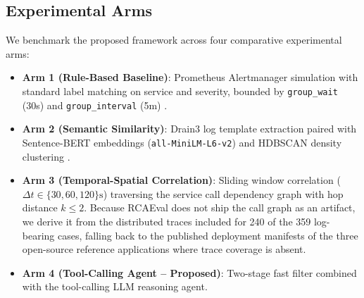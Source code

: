 \documentclass[conference]{IEEEtran}
\begin{document}
\subsection{Experimental Arms}
We benchmark the proposed framework across four comparative experimental arms:
\begin{itemize}
    \item \textbf{Arm 1 (Rule-Based Baseline)}: Prometheus Alertmanager simulation with standard label matching on service and severity, bounded by \texttt{group\_wait} (30s) and \texttt{group\_interval} (5m) \cite{prometheus-alertmanager}.
    \item \textbf{Arm 2 (Semantic Similarity)}: Drain3 log template extraction \cite{drain3} paired with Sentence-BERT embeddings (\texttt{all-MiniLM-L6-v2}) \cite{sbert} and HDBSCAN density clustering \cite{hdbscan}.
    \item \textbf{Arm 3 (Temporal-Spatial Correlation)}: Sliding window correlation ($\Delta t \in \{30, 60, 120\}\text{s}$) traversing the service call dependency graph with hop distance $k \le 2$. Because RCAEval does not ship the call graph as an artifact, we derive it from the distributed traces included for 240 of the 359 log-bearing cases, falling back to the published deployment manifests of the three open-source reference applications where trace coverage is absent.
    \item \textbf{Arm 4 (Tool-Calling Agent -- Proposed)}: Two-stage fast filter combined with the tool-calling LLM reasoning agent.
\end{itemize}
\end{document}
